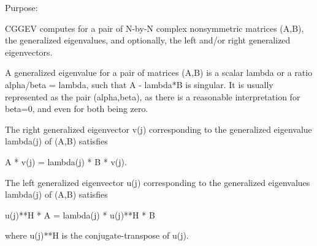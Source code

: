  \begin{DoxyParagraph}{Purpose\+: }
\begin{DoxyVerb} CGGEV computes for a pair of N-by-N complex nonsymmetric matrices
 (A,B), the generalized eigenvalues, and optionally, the left and/or
 right generalized eigenvectors.

 A generalized eigenvalue for a pair of matrices (A,B) is a scalar
 lambda or a ratio alpha/beta = lambda, such that A - lambda*B is
 singular. It is usually represented as the pair (alpha,beta), as
 there is a reasonable interpretation for beta=0, and even for both
 being zero.

 The right generalized eigenvector v(j) corresponding to the
 generalized eigenvalue lambda(j) of (A,B) satisfies

              A * v(j) = lambda(j) * B * v(j).

 The left generalized eigenvector u(j) corresponding to the
 generalized eigenvalues lambda(j) of (A,B) satisfies

              u(j)**H * A = lambda(j) * u(j)**H * B

 where u(j)**H is the conjugate-transpose of u(j).\end{DoxyVerb}
 
\end{DoxyParagraph}

